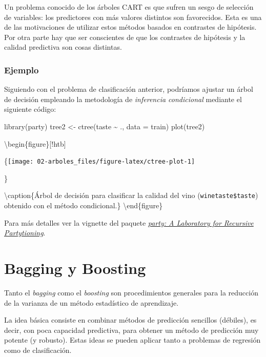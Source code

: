 \documentclass[
  spanish,
]{book}
\newenvironment{Shaded}{\begin{snugshade}}{\end{snugshade}}
\newcommand{\AttributeTok}[1]{\textcolor[rgb]{0.77,0.63,0.00}{#1}}
\newcommand{\FunctionTok}[1]{\textcolor[rgb]{0.00,0.00,0.00}{#1}}
\newcommand{\NormalTok}[1]{#1}
\newcommand{\OtherTok}[1]{\textcolor[rgb]{0.56,0.35,0.01}{#1}}
\newcommand{\SpecialCharTok}[1]{\textcolor[rgb]{0.00,0.00,0.00}{#1}}
\theoremstyle{break}
\theoremstyle{definition}
\theoremstyle{definition}
\theoremstyle{definition}
\theoremstyle{definition}
\theoremstyle{remark}
\begin{document}
Un problema conocido de los árboles CART es que sufren un sesgo de selección de variables: los predictores con más valores distintos son favorecidos.
Esta es una de las motivaciones de utilizar estos métodos basados en contrastes de hipótesis.
Por otra parte hay que ser conscientes de que los contrastes de hipótesis y la calidad predictiva son cosas distintas.

\hypertarget{ejemplo-1}{%
\subsection{Ejemplo}\label{ejemplo-1}}

Siguiendo con el problema de clasificación anterior, podríamos ajustar un árbol de decisión empleando la metodología de \emph{inferencia condicional} mediante el siguiente código:

\begin{Shaded}
\begin{Highlighting}[]
\FunctionTok{library}\NormalTok{(party)}
\NormalTok{tree2 }\OtherTok{\textless{}{-}} \FunctionTok{ctree}\NormalTok{(taste }\SpecialCharTok{\textasciitilde{}}\NormalTok{ ., }\AttributeTok{data =}\NormalTok{ train) }
\FunctionTok{plot}\NormalTok{(tree2)}
\end{Highlighting}
\end{Shaded}

\textbackslash begin\{figure\}{[}!htb{]}

\{\centering \texttt{[image: 02-arboles\_files/figure-latex/ctree-plot-1]}

\}

\textbackslash caption\{Árbol de decisión para clasificar la calidad del vino (\texttt{winetaste\$taste}) obtenido con el método condicional.\}\label{fig:ctree-plot}
\textbackslash end\{figure\}

Para más detalles ver la vignette del paquete \href{https://cran.r-project.org/web/packages/party/vignettes/party.pdf}{\emph{party: A Laboratory for Recursive Partytioning}}.

\hypertarget{bagging-boosting}{%
\chapter{Bagging y Boosting}\label{bagging-boosting}}

Tanto el \emph{bagging} como el \emph{boosting} son procedimientos generales para la reducción de la varianza de un método estadístico de aprendizaje.

La idea básica consiste en combinar métodos de predicción sencillos (débiles), es decir, con poca capacidad predictiva, para obtener un método de predicción muy potente (y robusto).
Estas ideas se pueden aplicar tanto a problemas de regresión como de clasificación.
\end{document}
